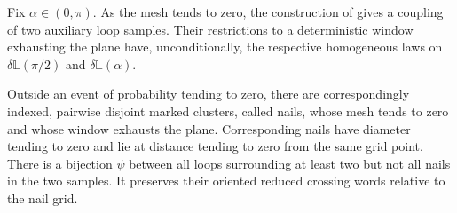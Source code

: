\begin{lemma}
\label{lem:rr-nails}
Fix $\alpha\in(0,\pi)$.  As the mesh tends to zero, the construction
of \cite[Section~3.6]{DCKKMO2026Rotation} gives a coupling of two
auxiliary loop samples.  Their restrictions to a deterministic
window exhausting the plane have, unconditionally, the respective
homogeneous laws on $\delta\mathbb L(\pi/2)$ and
$\delta\mathbb L(\alpha)$.

Outside an event of probability tending to zero, there are
correspondingly indexed, pairwise disjoint marked
clusters, called nails, whose mesh tends to zero and whose window
exhausts the plane.  Corresponding nails have diameter tending to
zero and lie at distance tending to zero from the same grid point.
There is a bijection $\psi$ between all loops surrounding at least
two but not all nails in the two samples.  It preserves their
oriented reduced crossing words relative to the nail grid.
\end{lemma}

